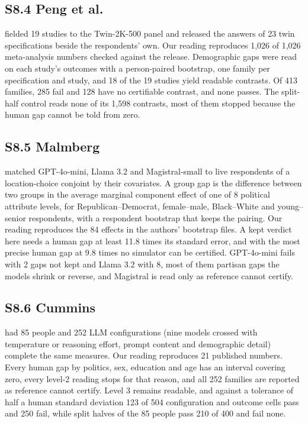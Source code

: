 \subsection*{S8.4 Peng et al.}

\citet{peng2025funhouse} fielded 19 studies to the Twin-2K-500 panel and released the answers of 23 twin specifications beside the respondents' own.
Our reading reproduces 1,026 of 1,026 meta-analysis numbers checked against the release.
Demographic gaps were read on each study's outcomes with a person-paired bootstrap, one family per specification and study, and 18 of the 19 studies yield readable contrasts.
Of 413 families, 285 fail and 128 have no certifiable contrast, and none passes.
The split-half control reads none of its 1,598 contrasts, most of them stopped because the human gap cannot be told from zero.

\subsection*{S8.5 Malmberg}

\citet{malmberg2026conjoint} matched GPT-4o-mini, Llama 3.2 and Magistral-small to live respondents of a location-choice conjoint by their covariates.
A group gap is the difference between two groups in the average marginal component effect of one of 8 political attribute levels, for Republican--Democrat, female--male, Black--White and young--senior respondents, with a respondent bootstrap that keeps the pairing.
Our reading reproduces the 84 effects in the authors' bootstrap files.
A kept verdict here needs a human gap at least 11.8 times its standard error, and with the most precise human gap at 9.8 times no simulator can be certified.
GPT-4o-mini fails with 2 gaps not kept and Llama 3.2 with 8, most of them partisan gaps the models shrink or reverse, and Magistral is read only as reference cannot certify.

\subsection*{S8.6 Cummins}

\citet{cummins2026flexibility} had 85 people and 252 LLM configurations (nine models crossed with temperature or reasoning effort, prompt content and demographic detail) complete the same measures.
Our reading reproduces 21 published numbers.
Every human gap by politics, sex, education and age has an interval covering zero, every level-2 reading stops for that reason, and all 252 families are reported as reference cannot certify.
Level 3 remains readable, and against a tolerance of half a human standard deviation 123 of 504 configuration and outcome cells pass and 250 fail, while split halves of the 85 people pass 210 of 400 and fail none.

